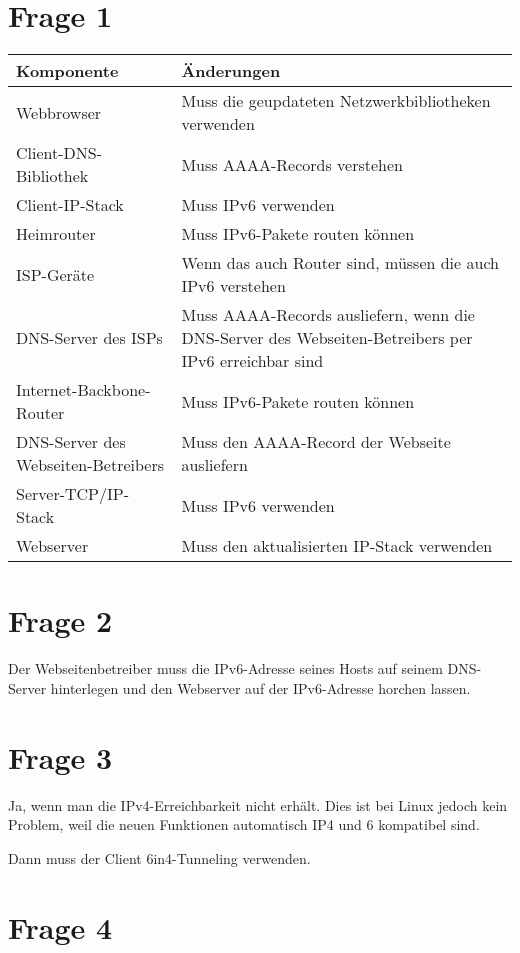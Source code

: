 \documentclass[10pt,a4paper]{article}
\begin{document}
\section{Frage 1}

\begin{tabular}{ll}
Komponente & Änderungen \\
\hline
Webbrowser & Muss die geupdateten Netzwerkbibliotheken verwenden \\
Client-DNS-Bibliothek & Muss AAAA-Records verstehen \\
Client-IP-Stack & Muss IPv6 verwenden \\
Heimrouter & Muss IPv6-Pakete routen können \\
ISP-Geräte & Wenn das auch Router sind, müssen die auch IPv6 verstehen \\
DNS-Server des ISPs & Muss AAAA-Records ausliefern, wenn die DNS-Server des Webseiten-Betreibers per IPv6 erreichbar sind \\
Internet-Backbone-Router & Muss IPv6-Pakete routen können \\
DNS-Server des Webseiten-Betreibers & Muss den AAAA-Record der Webseite ausliefern \\
Server-TCP/IP-Stack & Muss IPv6 verwenden \\
Webserver & Muss den aktualisierten IP-Stack verwenden \\
\end{tabular}

\section{Frage 2}

Der Webseitenbetreiber muss die IPv6-Adresse seines Hosts auf seinem DNS-Server
hinterlegen und den Webserver auf der IPv6-Adresse horchen lassen.

\section{Frage 3}

Ja, wenn man die IPv4-Erreichbarkeit nicht erhält. Dies ist bei Linux jedoch
kein Problem, weil die neuen Funktionen automatisch IP4 und 6 kompatibel sind.

Dann muss der Client 6in4-Tunneling verwenden.

\section{Frage 4}
\end{document}

